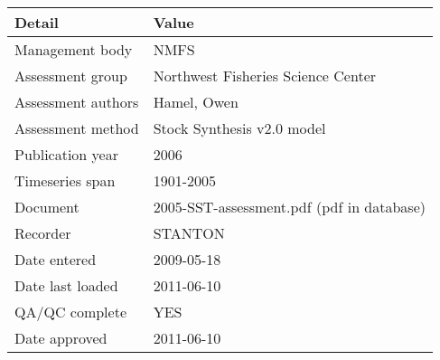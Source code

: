 \begin{table}[htb]
\centering
\begin{tabular}{lp{7cm}}
\toprule
Detail & Value \\
\midrule
Management body    & NMFS                                      \\
Assessment group   & Northwest Fisheries Science Center        \\
Assessment authors & Hamel, Owen                               \\
Assessment method  & Stock Synthesis v2.0 model                \\
Publication year   & 2006                                      \\
Timeseries span    & 1901-2005                                 \\
Document           & 2005-SST-assessment.pdf (pdf in database) \\
Recorder           & STANTON                                   \\
Date entered       & 2009-05-18                                \\
Date last loaded   & 2011-06-10                                \\
QA/QC complete     & YES                                       \\
Date approved      & 2011-06-10                                \\
\bottomrule
\end{tabular}
\label{tab:assessdet}
\end{table}
